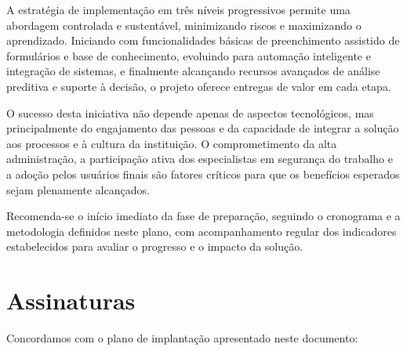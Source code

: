 \documentclass[12pt,a4paper]{article}
\begin{document}
A estratégia de implementação em três níveis progressivos permite uma abordagem controlada e sustentável, minimizando riscos e maximizando o aprendizado. Iniciando com funcionalidades básicas de preenchimento assistido de formulários e base de conhecimento, evoluindo para automação inteligente e integração de sistemas, e finalmente alcançando recursos avançados de análise preditiva e suporte à decisão, o projeto oferece entregas de valor em cada etapa.

O sucesso desta iniciativa não depende apenas de aspectos tecnológicos, mas principalmente do engajamento das pessoas e da capacidade de integrar a solução aos processos e à cultura da instituição. O comprometimento da alta administração, a participação ativa dos especialistas em segurança do trabalho e a adoção pelos usuários finais são fatores críticos para que os benefícios esperados sejam plenamente alcançados.

Recomenda-se o início imediato da fase de preparação, seguindo o cronograma e a metodologia definidos neste plano, com acompanhamento regular dos indicadores estabelecidos para avaliar o progresso e o impacto da solução.

\clearpage
\section*{Assinaturas}

Concordamos com o plano de implantação apresentado neste documento:

\vspace{1cm}
\end{document}
